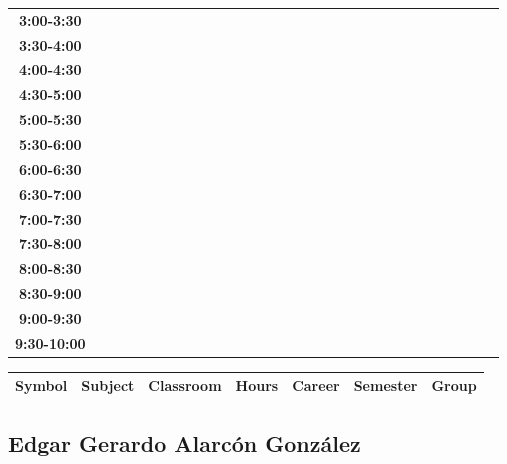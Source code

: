 \documentclass{article}
\begin{document}
\begin{table}[ht]
\begin{tabular}{|c|c|c|c|c|c|c|c|c|c|c|c|c|c|c|c|c|c|c|c|c|c|c|c|c|c|c|c|c|c|}
\textbf{3:00-3:30} &   &   &   &   &   &   &   \\
 \cline{1-8} 
\textbf{3:30-4:00} &   &   &   &   &   &   &   \\
 \cline{1-8} 
\textbf{4:00-4:30} &   &   &   &   &   &   &   \\
 \cline{1-8} 
\textbf{4:30-5:00} &   &   &   &   &   &   &   \\
 \cline{1-8} 
\textbf{5:00-5:30} &   &   &   &   &   &   &   \\
 \cline{1-8} 
\textbf{5:30-6:00} &   &   &   &   &   &   &   \\
 \cline{1-8} 
\textbf{6:00-6:30} &   &   &   &   &   &   &   \\
 \cline{1-8} 
\textbf{6:30-7:00} &   &   &   &   &   &   &   \\
 \cline{1-8} 
\textbf{7:00-7:30} &   &   &   &   &   &   &   \\
 \cline{1-8} 
\textbf{7:30-8:00} &   &   &   &   &   &   &   \\
 \cline{1-8} 
\textbf{8:00-8:30} &   &   &   &   &   &   &   \\
 \cline{1-8} 
\textbf{8:30-9:00} &   &   &   &   &   &   &   \\
 \cline{1-8} 
\textbf{9:00-9:30} &   &   &   &   &   &   &   \\
 \cline{1-8} 
\textbf{9:30-10:00} &   &   &   &   &   &   &   \\
 \cline{1-8} 
\end{tabular}\end{table}

        
        \begin{tabular}{|>{\centering\arraybackslash}m{2cm}|>{\centering\arraybackslash}m{4cm}|>{\centering\arraybackslash}m{2cm}|>{\centering\arraybackslash}m{2cm}|>{\centering\arraybackslash}m{2cm}|>{\centering\arraybackslash}m{2cm}|>{\centering\arraybackslash}m{2cm}|}
        \hline
        \textbf{Symbol} & \textbf{Subject} & \textbf{Classroom} & \textbf{Hours} & \textbf{Career} & \textbf{Semester} & \textbf{Group} \\
        \hline
        \end{tabular}
                    

        \newpage
        

        \subsection{Edgar Gerardo Alarc\'on Gonz\'alez}
        \vspace*{.1cm}
        
\end{document}
